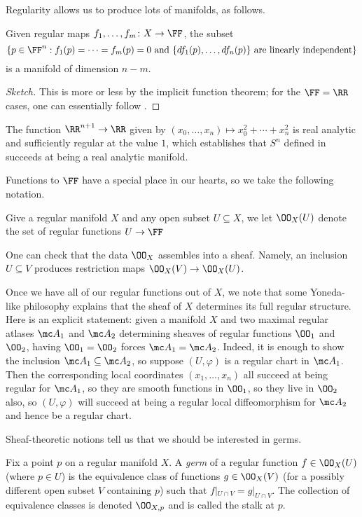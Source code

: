 \documentclass[../notes.tex]{subfiles}
\begin{document}
Regularity allows us to produce lots of manifolds, as follows.
\begin{theorem}
	Given regular maps $f_1,\ldots,f_m\colon X\to\FF$, the subset
	\[\left\{p\in\FF^n:f_1(p)=\cdots=f_m(p)=0\text{ and }\{df_1(p),\ldots,df_n(p)\}\text{ are linearly independent}\right\}\]
	is a manifold of dimension $n-m$.
\end{theorem}
\begin{proof}[Sketch]
	This is more or less by the implicit function theorem; for the $\FF=\RR$ cases, one can essentially follow \cite[Corollary~5.14]{lee-manifolds}.
\end{proof}
\begin{example}
	The function $\RR^{n+1}\to\RR$ given by $(x_0,\ldots,x_n)\mapsto x_0^2+\cdots+x_n^2$ is real analytic and sufficiently regular at the value $1$, which establishes that $S^n$ defined in  succeeds at being a real analytic manifold.
\end{example}
Functions to $\FF$ have a special place in our hearts, so we take the following notation.
\begin{notation}
	Give a regular manifold $X$ and any open subset $U\subseteq X$, we let $\OO_X(U)$ denote the set of regular functions $U\to\FF$
\end{notation}
\begin{remark}
	One can check that the data $\OO_X$ assembles into a sheaf. Namely, an inclusion $U\subseteq V$ produces restriction maps $\OO_X(V)\to\OO_X(U)$.
\end{remark}
\begin{remark}
	Once we have all of our regular functions out of $X$, we note that some Yoneda-like philosophy explains that the sheaf of $X$ determines its full regular structure. Here is an explicit statement: given a manifold $X$ and two maximal regular atlases $\mc A_1$ and $\mc A_2$ determining sheaves of regular functions $\OO_1$ and $\OO_2$, having $\OO_1=\OO_2$ forces $\mc A_1=\mc A_2$. Indeed, it is enough to show the inclusion $\mc A_1\subseteq\mc A_2$, so suppose $(U,\varphi)$ is a regular chart in $\mc A_1$. Then the corresponding local coordinates $(x_1,\ldots,x_n)$ all succeed at being regular for $\mc A_1$, so they are smooth functions in $\OO_1$, so they live in $\OO_2$ also, so $(U,\varphi)$ will succeed at being a regular local diffeomorphism for $\mc A_2$ and hence be a regular chart.
\end{remark}
Sheaf-theoretic notions tell us that we should be interested in germs.
\begin{definition}[germ]
	Fix a point $p$ on a regular manifold $X$. A \textit{germ} of a regular function $f\in\OO_X(U)$ (where $p\in U$) is the equivalence class of functions $g\in\OO_X(V)$ (for a possibly different open subset $V$ containing $p$) such that $f|_{U\cap V}=g|_{U\cap V}$. The collection of equivalence classes is denoted $\OO_{X,p}$ and is called the stalk at $p$.
\end{definition}
\end{document}

